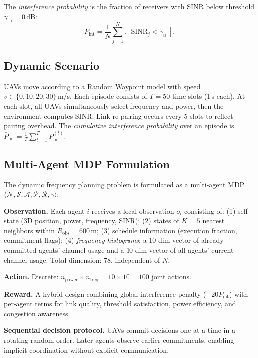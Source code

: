 \documentclass[journal]{IEEEtran}
\begin{document}
The \emph{interference probability} is the fraction of receivers with SINR below threshold $\gamma_{\text{th}} = 0$\,dB:
\begin{equation}
P_{\text{int}} = \frac{1}{N}\sum_{j=1}^{N}\mathbb{I}[\text{SINR}_j < \gamma_{\text{th}}].
\end{equation}

\subsection{Dynamic Scenario}

UAVs move according to a Random Waypoint model with speed $v \in \{0, 10, 20, 30\}$\,m/s. Each episode consists of $T = 50$ time slots (1\,s each). At each slot, all UAVs simultaneously select frequency and power, then the environment computes SINR. Link re-pairing occurs every 5 slots to reflect pairing overhead. The \emph{cumulative interference probability} over an episode is $\bar{P}_{\text{int}} = \frac{1}{T}\sum_{t=1}^{T} P_{\text{int}}^{(t)}$.

\subsection{Multi-Agent MDP Formulation}

The dynamic frequency planning problem is formulated as a multi-agent MDP $\langle \mathcal{N}, \mathcal{S}, \mathcal{A}, \mathcal{P}, \mathcal{R}, \gamma \rangle$:

\textbf{Observation.} Each agent $i$ receives a local observation $o_i$ consisting of: (1) self state (3D position, power, frequency, SINR); (2) states of $K=5$ nearest neighbors within $R_{\text{obs}}=600$\,m; (3) schedule information (execution fraction, commitment flags); (4) \emph{frequency histograms}: a 10-dim vector of already-committed agents' channel usage and a 10-dim vector of all agents' current channel usage. Total dimension: 78, independent of $N$.

\textbf{Action.} Discrete: $n_{\text{power}} \times n_{\text{freq}} = 10 \times 10 = 100$ joint actions.

\textbf{Reward.} A hybrid design combining global interference penalty ($-20 P_{\text{int}}$) with per-agent terms for link quality, threshold satisfaction, power efficiency, and congestion awareness.

\textbf{Sequential decision protocol.} UAVs commit decisions one at a time in a rotating random order. Later agents observe earlier commitments, enabling implicit coordination without explicit communication.
\end{document}

